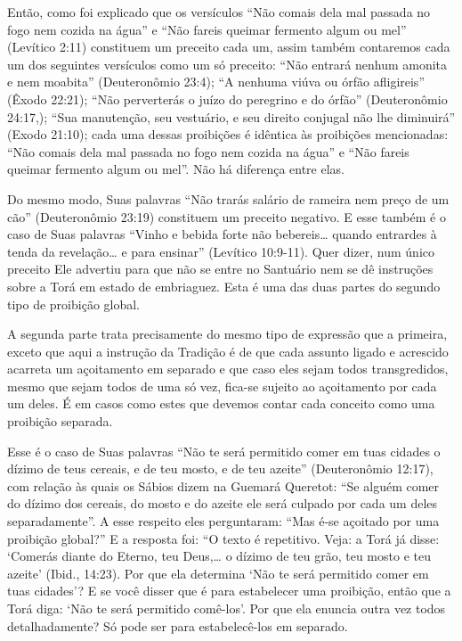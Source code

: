Então, como foi explicado que os versículos ``Não comais dela mal
passada no fogo nem cozida na água'' e ``Não fareis queimar fermento
algum ou mel'' (Levítico 2:11) constituem um preceito cada um, assim
também contaremos cada um dos seguintes versículos como um só preceito:
``Não entrará nenhum amonita e nem moabita'' (Deuteronômio 23:4); ``A
nenhuma viúva ou órfão afligireis'' (Êxodo 22:21); ``Não perverterás o
juízo do peregrino e do órfão'' (Deuteronômio 24:17,); ``Sua
manutenção, seu vestuário, e seu direito conjugal não lhe diminuirá''
(Exodo 21:10); cada uma dessas proibições é idêntica às proibições
mencionadas: ``Não comais dela mal passada no fogo nem cozida na água''
e ``Não fareis queimar fermento algum ou mel''. Não há diferença entre
elas.

Do mesmo modo, Suas palavras ``Não trarás salário de rameira nem preço
de um cão'' (Deuteronômio 23:19) constituem um preceito negativo. E esse
também é o caso de Suas palavras ``Vinho e bebida forte não bebereis\ldots{}
quando entrardes à tenda da revelação\ldots{} e para ensinar'' (Levítico
10:9-11). Quer dizer, num único preceito Ele advertiu para que não se
entre no Santuário nem se dê instruções sobre a Torá em estado de
embriaguez. Esta é uma das duas partes do segundo tipo de proibição
global.

A segunda parte trata precisamente do mesmo tipo de expressão que a
primeira, exceto que aqui a instrução da Tradição é de que cada assunto
ligado e acrescido acarreta um açoitamento em separado e que caso eles
sejam todos transgredidos, mesmo que sejam todos de uma só vez, fica-se
sujeito ao açoitamento por cada um deles. É em casos como estes que
devemos contar cada conceito como uma proibição separada.



Esse é o caso de Suas palavras ``Não te será permitido comer em tuas
cidades o dízimo de teus cereais, e de teu mosto, e de teu azeite''
(Deuteronômio 12:17), com relação às quais os Sábios dizem na Guemará
Queretot: ``Se alguém comer do dízimo dos cereais, do mosto e do azeite
ele será culpado por cada um deles separadamente''. A esse respeito eles
perguntaram: ``Mas é-se açoitado por uma proibição global?'' E a
resposta foi: ``O texto é repetitivo. Veja: a Torá já disse: `Comerás
diante do Eterno, teu Deus,\ldots{} o dízimo de teu grão, teu mosto e teu
azeite' (Ibid., 14:23). Por que ela determina `Não te será permitido
comer em tuas cidades'? E se você disser que é para estabelecer uma
proibição, então que a Torá diga: `Não te será permitido comê-los'.
Por que ela enuncia outra vez todos detalhadamente? Só pode ser para
estabelecê-los em separado.


